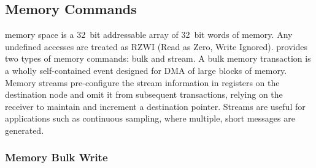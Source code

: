\subsection{Memory Commands}
\label{cmd:mem}
\proto memory space is a 32~bit addressable array of 32~bit words of memory.
Any undefined accesses are treated as RZWI (Read as Zero, Write Ignored).
\proto provides two types of memory commands: bulk and stream. A bulk memory
transaction is a wholly self-contained event designed for DMA of large blocks
of memory. Memory streams pre-configure the stream information in \proto
registers on the destination node and omit it from subsequent transactions,
relying on the receiver to maintain and increment a destination pointer.
Streams are useful for applications such as continuous sampling, where
multiple, short messages are generated.

\subsubsection{Memory Bulk Write}
\label{cmd:mem-bulk-write}

